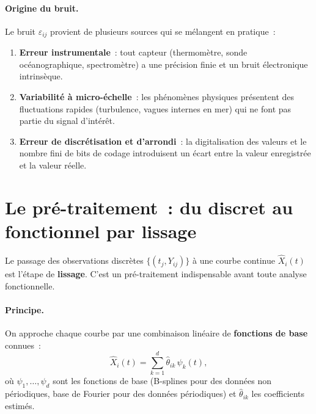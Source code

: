 \documentclass[11pt, a4paper]{article}
\begin{document}
\paragraph{Origine du bruit.}
Le bruit $\varepsilon_{ij}$ provient de plusieurs sources qui se m\'elangent en pratique~:
\begin{enumerate}[nosep]
    \item \textbf{Erreur instrumentale}~: tout capteur (thermom\`etre, sonde oc\'eanographique, spectrom\`etre) a une pr\'ecision finie et un bruit \'electronique intrins\`eque.
    \item \textbf{Variabilit\'e \`a micro-\'echelle}~: les ph\'enom\`enes physiques pr\'esentent des fluctuations rapides (turbulence, vagues internes en mer) qui ne font pas partie du signal d'int\'er\^et.
    \item \textbf{Erreur de discr\'etisation et d'arrondi}~: la digitalisation des valeurs et le nombre fini de bits de codage introduisent un \'ecart entre la valeur enregistr\'ee et la valeur r\'eelle.
\end{enumerate}

\section{Le pr\'e-traitement~: du discret au fonctionnel par lissage}

Le passage des observations discr\`etes $\{(t_j, Y_{ij})\}$ \`a une courbe continue $\hat{X}_i(t)$ est l'\'etape de \textbf{lissage}. C'est un pr\'e-traitement indispensable avant toute analyse fonctionnelle.

\paragraph{Principe.} On approche chaque courbe par une combinaison lin\'eaire de \textbf{fonctions de base} connues~:
\[
    \hat{X}_i(t) = \sum_{k=1}^{d} \hat{\theta}_{ik} \, \psi_k(t),
\]
o\`u $\psi_1, \ldots, \psi_d$ sont les fonctions de base (B-splines pour des donn\'ees non p\'eriodiques, base de Fourier pour des donn\'ees p\'eriodiques) et $\hat{\theta}_{ik}$ les coefficients estim\'es.
\end{document}
